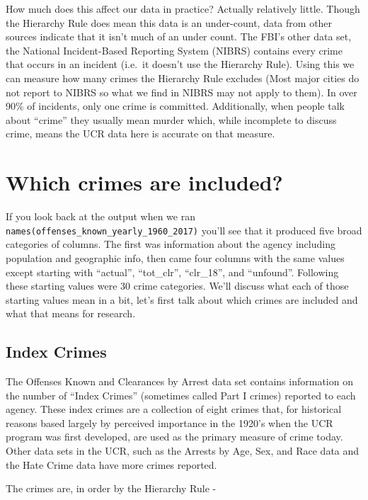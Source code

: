 \documentclass[
  12pt,
  openany]{book}
\begin{document}
How much does this affect our data in practice? Actually relatively little. Though the Hierarchy Rule does mean this data is an under-count, data from other sources indicate that it isn't much of an under count. The FBI's other data set, the National Incident-Based Reporting System (NIBRS) contains every crime that occurs in an incident (i.e.~it doesn't use the Hierarchy Rule). Using this we can measure how many crimes the Hierarchy Rule excludes (Most major cities do not report to NIBRS so what we find in NIBRS may not apply to them). In over 90\% of incidents, only one crime is committed. Additionally, when people talk about ``crime'' they usually mean murder which, while incomplete to discuss crime, means the UCR data here is accurate on that measure.

\hypertarget{which-crimes-are-included}{%
\section{Which crimes are included?}\label{which-crimes-are-included}}

If you look back at the output when we ran \texttt{names(offenses\_known\_yearly\_1960\_2017)} you'll see that it produced five broad categories of columns. The first was information about the agency including population and geographic info, then came four columns with the same values except starting with ``actual'', ``tot\_clr'', ``clr\_18'', and ``unfound''. Following these starting values were 30 crime categories. We'll discuss what each of those starting values mean in a bit, let's first talk about which crimes are included and what that means for research.

\hypertarget{index-crimes}{%
\subsection{Index Crimes}\label{index-crimes}}

The Offenses Known and Clearances by Arrest data set contains information on the number of ``Index Crimes'' (sometimes called Part I crimes) reported to each agency. These index crimes are a collection of eight crimes that, for historical reasons based largely by perceived importance in the 1920's when the UCR program was first developed, are used as the primary measure of crime today. Other data sets in the UCR, such as the Arrests by Age, Sex, and Race data and the Hate Crime data have more crimes reported.

The crimes are, in order by the Hierarchy Rule -
\end{document}
